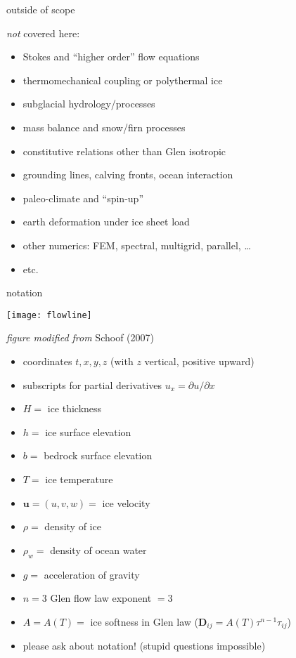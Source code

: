 \begin{frame}{outside of scope}

\large\emph{not} \normalsize covered here:\normalsize
\medskip

  \begin{itemize}
  \item Stokes and ``higher order'' flow equations
  \item thermomechanical coupling or polythermal ice
  \item subglacial hydrology/processes
  \item mass balance and snow/firn processes
  \item constitutive relations other than Glen isotropic
  \item grounding lines, calving fronts, ocean interaction
  \item paleo-climate and ``spin-up''
  \item earth deformation under ice sheet load
  \item other numerics: FEM, spectral, multigrid, parallel, \dots
  \item etc.
  \end{itemize}

\end{frame}


\begin{frame}{notation} 

\begin{center}
  \texttt{[image: flowline]}

\tiny \emph{figure modified from} Schoof (2007)\nocite{SchoofMarine1}
\end{center}

\scriptsize
  \begin{itemize}
  \item coordinates $t,x,y,z$  (with $z$ vertical, positive upward)
  \item subscripts for partial derivatives $u_x = \partial u/\partial x$
  \item $H=$ ice thickness
  \item $h=$ ice surface elevation
  \item $b=$ bedrock surface elevation
  \item $T=$ ice temperature
  \item $\mathbf{u}=(u,v,w)=$ ice velocity
  \item $\rho=$ density of ice
  \item $\rho_w=$ density of ocean water
  \item $g=$ acceleration of gravity
  \item $n=3$ Glen flow law exponent $=3$
  \item $A=A(T)=$ ice softness in Glen law ($\mathbf{D}_{ij} = A(T) \tau^{n-1} \tau_{ij}$)
  \item \alert{please ask about notation!}  (stupid questions impossible)
  \end{itemize}

\end{frame}


